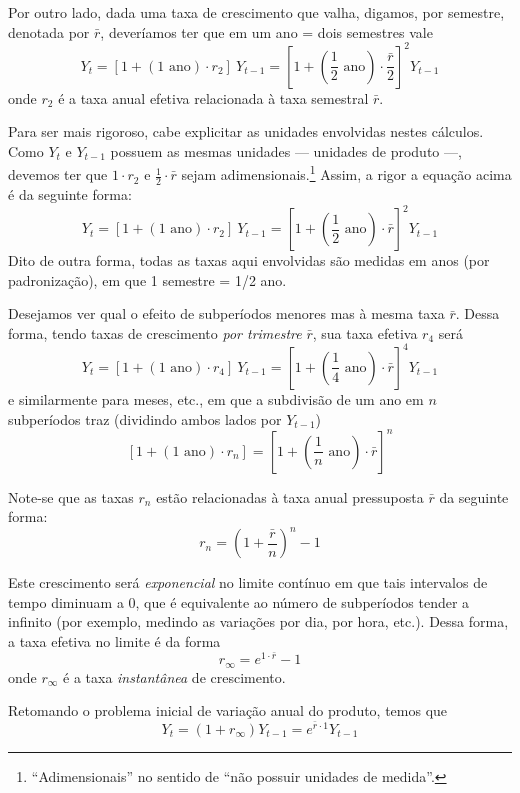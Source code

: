 Por outro lado, dada uma taxa de crescimento que valha, digamos, por semestre, denotada por $\bar{r}$, deveríamos ter que em um ano = dois semestres vale
$$
Y_t = [1+ (1\text{ ano}) \cdot r_2]\ Y_{t-1} = \left[1+ \left(\frac{1}{2} \text{ ano}\right) \cdot \frac{\bar{r}}{2}\right]^2 Y_{t-1}
$$
onde $r_2$ é a taxa anual efetiva relacionada à taxa semestral $\bar{r}$. 

Para ser mais rigoroso, cabe explicitar as unidades envolvidas nestes cálculos. Como $Y_t$ e $Y_{t-1}$ possuem as mesmas unidades --- unidades de produto ---, devemos ter que $1 \cdot r_2$ e $\frac{1}{2} \cdot \bar{r}$ sejam adimensionais.\footnote{``Adimensionais'' no sentido de ``não possuir unidades de medida''.} Assim, a rigor a equação acima é da seguinte forma:
$$
Y_t = [1+ (1\text{ ano}) \cdot r_2]\ Y_{t-1} = \left[1+ \left(\frac{1}{2} \text{ ano}\right) \cdot \bar{r}\right]^2 Y_{t-1}
$$
Dito de outra forma, todas as taxas aqui envolvidas são medidas em anos (por padronização), em que 1 semestre = 1/2 ano. 

Desejamos ver qual o efeito de subperíodos menores mas à mesma taxa $\bar{r}$. Dessa forma, tendo taxas de crescimento \textit{por trimestre} $\bar{r}$, sua taxa efetiva $r_4$ será
$$
Y_t = [1+ (1\text{ ano}) \cdot r_4]\ Y_{t-1} =  \left[1+ \left(\frac{1}{4} \text{ ano}\right) \cdot \bar{r}\right]^4 Y_{t-1}
$$
e similarmente para meses, etc., em que a subdivisão de um ano em $n$ subperíodos traz (dividindo ambos lados por $Y_{t-1}$)
$$
[1+ (1\text{ ano}) \cdot r_n] = \left[1+ \left(\frac{1}{n} \text{ ano}\right) \cdot \bar{r} \right]^n
$$

Note-se que as taxas $r_n$ estão relacionadas à taxa anual pressuposta $\bar{r}$ da seguinte forma:
$$
r_n = \left(1 + \frac{\bar{r}}{n}\right)^{n} - 1
$$

Este crescimento será \textit{exponencial} no limite contínuo em que tais intervalos de tempo diminuam a $0$, que é equivalente ao número de subperíodos tender a infinito (por exemplo, medindo as variações por dia, por hora, etc.). Dessa forma, a taxa efetiva no limite é da forma
$$
r_\infty = e^{1 \cdot \bar{r}} - 1
$$
onde $r_\infty$ é a taxa \textit{instantânea} de crescimento. 

Retomando o problema inicial de variação anual do produto, temos que
$$
Y_t = \left(1 + r_\infty\right) Y_{t-1} = e^{\bar{r} \cdot 1} Y_{t-1}
$$

